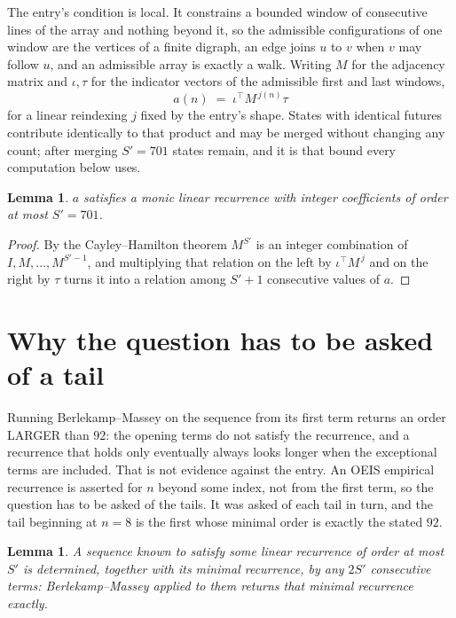 \documentclass[11pt,a4paper]{article}
\theoremstyle{plain}
\newtheorem{lemma}[theorem]{Lemma}
\theoremstyle{definition}
\begin{document}
The entry's condition is local. It constrains a bounded window of consecutive lines of the
array and nothing beyond it, so the admissible configurations of one window are the vertices of
a finite digraph, an edge joins $u$ to $v$ when $v$ may follow $u$, and an admissible array is
exactly a walk. Writing $M$ for the adjacency matrix and $\iota,\tau$ for the indicator vectors
of the admissible first and last windows,
\[
a(n)\;=\;\iota^{\!\top}M^{\,j(n)}\tau
\]
for a linear reindexing $j$ fixed by the entry's shape. States with identical futures
contribute identically to that product and may be merged without changing any count; after
merging $S'=701$ states remain, and it is that bound every computation below uses.

\begin{lemma}\label{lem:cf}
$a$ satisfies a monic linear recurrence with integer coefficients of order at most $S'=701$.
\end{lemma}

\begin{proof}
By the Cayley--Hamilton theorem $M^{S'}$ is an integer combination of $I,M,\dots,M^{S'-1}$,
and multiplying that relation on the left by $\iota^{\!\top}M^{\,j}$ and on the right by
$\tau$ turns it into a relation among $S'+1$ consecutive values of $a$.
\end{proof}

\section{Why the question has to be asked of a tail}

Running Berlekamp--Massey on the sequence from its first term returns an order LARGER than $92$: the opening terms do not satisfy the recurrence, and a recurrence that holds only eventually always looks longer when the exceptional terms are included. That is not evidence against the entry. An OEIS empirical recurrence is asserted for $n$ beyond some index, not from the first term, so the question has to be asked of the tails. It was asked of each tail in turn, and the tail beginning at $n=8$ is the first whose minimal order is exactly the stated $92$.

\begin{lemma}\label{lem:bm}
A sequence known to satisfy some linear recurrence of order at most $S'$ is determined,
together with its minimal recurrence, by any $2S'$ consecutive terms: Berlekamp--Massey applied
to them returns that minimal recurrence exactly.
\end{lemma}
\end{document}
